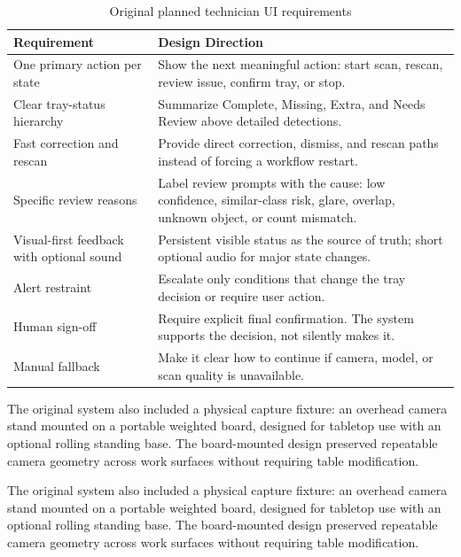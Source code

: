\documentclass[10pt,a4paper]{article}
\begin{document}
\begin{table}[H]
\centering
\caption{Original planned technician UI requirements}
\label{tab:original-planned-technician-ui-requirements}
\small\renewcommand{\arraystretch}{1.2}\setlength{\tabcolsep}{4pt}
\begin{tabularx}{\textwidth}{|>{\raggedright\arraybackslash}X|>{\raggedright\arraybackslash}X|}
\hline
Requirement & Design Direction \\
\hline
One primary action per state & Show the next meaningful action: start scan, rescan, review issue, confirm tray, or stop. \\
\hline
Clear tray-status hierarchy & Summarize Complete, Missing, Extra, and Needs Review above detailed detections. \\
\hline
Fast correction and rescan & Provide direct correction, dismiss, and rescan paths instead of forcing a workflow restart. \\
\hline
Specific review reasons & Label review prompts with the cause: low confidence, similar-class risk, glare, overlap, unknown object, or count mismatch. \\
\hline
Visual-first feedback with optional sound & Persistent visible status as the source of truth; short optional audio for major state changes. \\
\hline
Alert restraint & Escalate only conditions that change the tray decision or require user action. \\
\hline
Human sign-off & Require explicit final confirmation. The system supports the decision, not silently makes it. \\
\hline
Manual fallback & Make it clear how to continue if camera, model, or scan quality is unavailable. \\
\hline
\end{tabularx}
\end{table}

The original system also included a physical capture fixture: an overhead
camera stand mounted on a portable weighted board, designed for tabletop use
with an optional rolling standing base. The board-mounted design preserved
repeatable camera geometry across work surfaces without requiring table
modification.


The original system also included a physical capture fixture: an overhead
camera stand mounted on a portable weighted board, designed for tabletop use
with an optional rolling standing base. The board-mounted design preserved
repeatable camera geometry across work surfaces without requiring table
modification.
\end{document}
